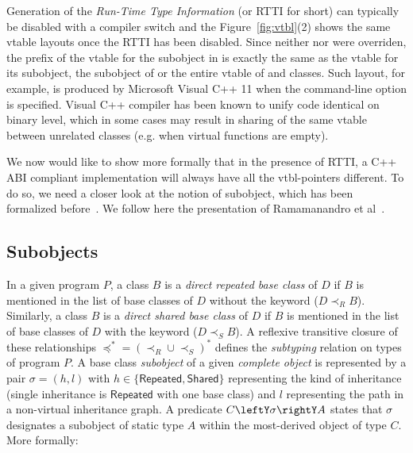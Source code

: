 Generation of the \emph{Run-Time Type Information} (or RTTI for short) can 
typically be disabled with a compiler switch and the Figure~\ref{fig:vtbl}(2) 
shows the same vtable layouts once the RTTI has been disabled. Since neither 
 nor  were overriden, the prefix of the vtable for the 
 subobject in  is exactly the same as the vtable for its 
 subobject, the  subobject of  or the entire vtable of 
 and  classes. Such layout, for example, is produced by 
Microsoft Visual C++ 11 when the command-line option  is specified. 
Visual C++ compiler has been known to unify code identical on binary level, 
which in some cases may result in sharing of the same vtable between unrelated 
classes (e.g. when virtual functions are empty).


We now would like to show more formally that in the presence of RTTI, a C++ ABI 
compliant implementation will always have all the vtbl-pointers different. To do 
so, we need a closer look at the notion of subobject, which has been formalized 
before~\cite{RF95,WNST06,RDL11}. We follow here the presentation of Ramamanandro 
et al~\cite{RDL11}.

\subsection{Subobjects}
\label{sec:subobj}

In a given program $P$, a class $B$ is a \emph{direct repeated base class} of 
$D$ if $B$ is mentioned in the list of base classes of $D$ without the 
 keyword ($D \prec_R B$). Similarly, a class $B$ is a \emph{direct 
shared base class} of $D$ if $B$ is mentioned in the list of base classes of $D$ 
with the  keyword ($D \prec_S B$). A reflexive transitive closure 
of these relationships $\preceq^*=(\prec_R \cup \prec_S)^*$ defines the 
\emph{subtyping} relation on types of program $P$.
A base class \emph{subobject} of a given \emph{complete object} is represented by a pair 
$\sigma = (h,l)$ with $h \in \{\mathsf{Repeated},\mathsf{Shared}\}$ representing the 
kind of inheritance (single inheritance is $\mathsf{Repeated}$ with one base class) and $l$ 
representing the path in a non-virtual inheritance graph.
A predicate $C\leftY\sigma\rightY A$ states that $\sigma$ 
designates a subobject of static type $A$ within the most-derived object of 
type $C$. More formally:

